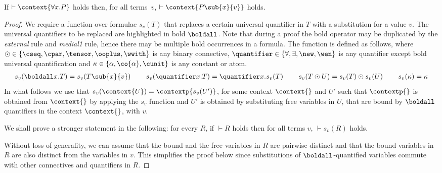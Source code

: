 \documentclass[UKenglish,acmsmall,authorversion]{acmart}
\theoremstyle{plain}
\begin{document}
\begin{lemma} 
If $\vdash \context{ \forall x. P }$ holds
 then, for all terms~$v$, $\vdash \context{ P\sub{x}{v} }$ holds.
\end{lemma}
\begin{proof}
We require a function over formulae $s_v(T)$ that replaces a certain universal quantifier in $T$ with a substitution for a value $v$. 
The universal quantifiers to be replaced are highlighted in bold $\boldall$. Note that during a proof the bold operator may be duplicated by the \textit{external} rule and \textit{medial1} rule, hence there may be multiple bold occurrences in a formula.
The function is defined as follows, where $\odot \in \left\{ \cseq, \cpar, \tensor, \ooplus, \wwith \right\}$ is any binary connective, $\quantifier \in \left\{ \forall, \exists, \new, \wen \right\}$ is any quantifier except bold universal quantification and $\kappa \in \left\{ \alpha, \co{\alpha}, \cunit \right\}$ is any constant or atom.
\begin{gather*}
\mathopen{s_v}\left(\boldall x. T\right) = \mathopen{s_v}\left(T \sub{x}{v}\right)
\qquad
\mathopen{s_v}\left(\quantifier x. T\right) =
\quantifier x. \mathopen{s_v}\left(T\right)
\qquad
\mathopen{s_v}\left( T \odot U \right) = 
\mathopen{s_v}\left(T\right) \odot \mathopen{s_v}\left(U\right)
\qquad
\mathopen{s_v}\left(\kappa\right) = \kappa
\end{gather*}
In what follows we use that $\mathopen{s_v}\left(\context{ U }\right) = \contextp{ \mathopen{s_v}\left(U'\right) }$, 
for some context $\context{}$ and $U'$ 
such that $\contextp{}$ is obtained from $\context{}$ by applying the $s_v$ function and
$U'$ is obtained by substituting free variables in $U$, 
that are bound by $\boldall$ quantifiers in the context $\context{}$, with $v$.

We shall prove a stronger statement in the following: 
for every $R$, if $\vdash R$ holds then for all terms $v$, $\vdash \mathopen{s_v}\left(R\right)$ holds.

Without loss of generality, we can assume that the bound and the free variables in $R$ are pairwise
distinct and that the bound variables in $R$ are also distinct from the 
variables in $v$. This simplifies the proof below since substitutions of $\boldall$-quantified variables
commute with other connectives and quantifiers in $R.$


\end{proof}
\end{document}
